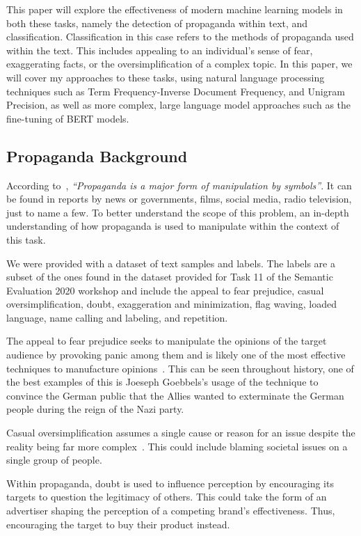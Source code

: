 \documentclass[twocolumn]{article}
\begin{document}
This paper will explore the effectiveness of modern machine learning models in both these tasks, namely the detection of propaganda within text, and classification. Classification in this case refers to the methods of propaganda used within the text. This includes appealing to an individual's sense of fear, exaggerating facts, or the oversimplification of a complex topic. In this paper, we will cover my approaches to these tasks, using natural language processing techniques such as Term Frequency-Inverse Document Frequency, and Unigram Precision, as well as more complex, large language model approaches such as the fine-tuning of BERT models. 

\subsection{Propaganda Background}

According to~\textcite{scott1994power}, \emph{``Propaganda is a major form of manipulation by symbols''}. It can be found in reports by news or governments, films, social media, radio television, just to name a few. To better understand the scope of this problem, an in-depth understanding of how propaganda is used to manipulate within the context of this task. 

We were provided with a dataset of text samples and labels. The labels are a subset of the ones found in the dataset provided for Task 11 of the Semantic Evaluation 2020 workshop and include the appeal to fear prejudice, casual oversimplification, doubt, exaggeration and minimization, flag waving, loaded language, name calling and labeling, and repetition. 

The appeal to fear prejudice seeks to manipulate the opinions of the target audience by provoking panic among them and is likely one of the most effective techniques to manufacture opinions~\cite{tannenbaum2015appeal}. This can be seen throughout history, one of the best examples of this is Joeseph Goebbels's usage of the technique to convince the German public that the Allies wanted to exterminate the German people during the reign of the Nazi party. 

Casual oversimplification assumes a single cause or reason for an issue despite the reality being far more complex~\cite{da-san-martino-etal-2020-semeval}. This could include blaming societal issues on a single group of people.  

Within propaganda, doubt is used to influence perception by encouraging its targets to question the legitimacy of others. This could take the form of an advertiser shaping the perception of a competing brand's effectiveness. Thus, encouraging the target to buy their product instead. 
\end{document}
